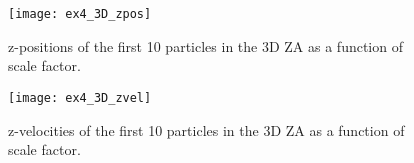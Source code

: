 \inputminted[firstline=113, lastline=144]{Python}{../ex4.py}
\inputminted[firstline=209]{Python}{../ex4.py}

\begin{figure}[h]
  \centering
  \texttt{[image: ex4\_3D\_zpos]}
  \caption{z-positions of the first 10 particles in the 3D ZA as a function of scale factor.}
\end{figure}

\begin{figure}[h]
  \centering
  \texttt{[image: ex4\_3D\_zvel]}
  \caption{z-velocities of the first 10 particles in the 3D ZA as a function of scale factor.}
\end{figure}
\clearpage
